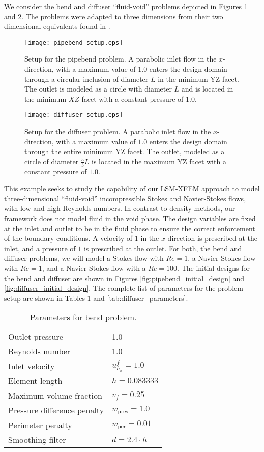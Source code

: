 We consider the bend and diffuser ``fluid-void'' problems depicted in Figures \ref{fig:pipebend_setup} and \ref{fig:diffuser_setup}. The problems were adapted to three dimensions from their two dimensional equivalents found in \citep{BP:03,KM:12,MM:14}.
%
\begin{figure}
	\centering
	\texttt{[image: pipebend\_setup.eps]}
	\caption{Setup for the pipebend problem. A parabolic inlet flow in the $x$-direction, with a maximum value of $1.0$ enters the design domain through a circular inclusion of diameter $L$ in the minimum YZ facet. The outlet is modeled as a circle with diameter $L$ and is located in the minimum $XZ$ facet with a constant pressure of $1.0$.}
	\label{fig:pipebend_setup}
\end{figure}
%
\begin{figure}
	\centering
	\texttt{[image: diffuser\_setup.eps]}
	\caption{Setup for the diffuser problem. A parabolic inlet flow in the $x$-direction, with a maximum value of $1.0$ enters the design domain through the entire minimum YZ facet. The outlet, modeled as a circle of diameter $\frac{5}{3}L$ is located in the maximum YZ facet with a constant pressure of $1.0$.}
	\label{fig:diffuser_setup}
\end{figure}
%
This example seeks to study the capability of our LSM-XFEM approach to model three-dimensional ``fluid-void''  incompressible Stokes and Navier-Stokes flows, with low and high Reynolds numbers. In contrast to density methods, our framework does not model fluid in the void phase. The design variables are fixed at the inlet and outlet to be in the fluid phase to ensure the correct enforcement of the boundary conditions. A velocity of $1$ in the $x$-direction is prescribed at the inlet, and a pressure of $1$ is prescribed at the outlet. For both, the bend and diffuser problems, we will model a Stokes flow with $Re=1$, a Navier-Stokes flow with $Re=1$, and a Navier-Stokes flow with a $Re=100$. The initial designs for the bend and diffuser are shown in Figures \ref{fig:pipebend_initial_design} and \ref{fig:diffuser_initial_design}. The complete list of parameters for the problem setup are shown in Tables \ref{tab:bend_parameters} and \ref{tab:diffuser_parameters}.
%
\begin{table}
	\centering
	\begin{tabular*}{0.75\textwidth}{l l}
	\hline
	Outlet pressure             & 1.0 \\
	Reynolds number             & 1.0 \\
    Inlet velocity              & $u^{f}_{h_{x}} = 1.0$ \\
    Element length              & $h=0.083333$ \\
    Maximum volume fraction     & $\bar{v}_{f} = 0.25$ \\
    Pressure difference penalty & $w_{\mathrm{pres}} = 1.0$ \\
    Perimeter penalty           & $w_{\mathrm{per}} = 0.01$ \\
	Smoothing filter            & $d = 2.4 \cdot h$ \\
	\hline
	\end{tabular*}
	\caption{Parameters for bend problem.}
	\label{tab:bend_parameters}
\end{table}
